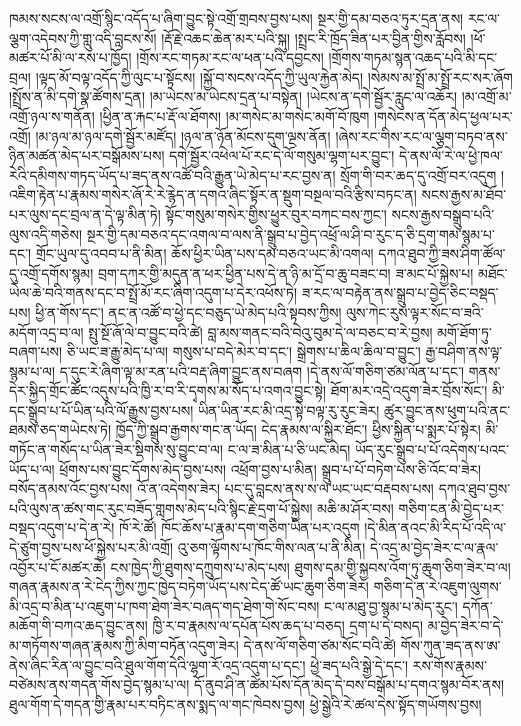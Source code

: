 \documentclass{article}
\begin{document}
ཁམས་སངས་ལ་འགྲོ་སྙིང་འདོད་པ་ཞིག་བྱུང་སྟེ་འགྲོ་གྲབས་བྱས་པས། སྔར་གྱི་དམ་བཅའ་ཏུར་དྲན་ནས། རང་ལ་ལྕག་འདེབས་ཀྱི་གླུ་འདི་བླངས་སོ། །རྡོ་རྗེ་འཆང་ཆེན་མར་པའི་སྐུ། །སྤྲང་རི་ཁྲོད་ཟིན་པར་བྱིན་གྱིས་རློབས། །ཕོ་མཚར་པོ་མི་ལ་རས་པ་ཁྱོད། །གྲོས་རང་གཏམ་རང་ལ་ཕན་པའི་དབྱངས། །གྲོགས་གཏམ་སྙན་འཆད་པའི་མི་དང་བྲལ། །ལྟད་མོ་བལྟ་འདོད་ཀྱི་ལུང་པ་སྟོངས། །སྐྱོ་བ་སངས་འདོད་ཀྱི་ཡུལ་རྐྱེན་མེད། །སེམས་མ་སྤྲོ་མ་སྤྲོ་རང་སར་ཞོག །སྤྲོས་ན་མི་དགེ་སྣ་ཚོགས་དྲན། །མ་ཡེངས་མ་ཡེངས་དྲན་པ་བསྟེན། །ཡེངས་ན་དགེ་སྦྱོར་རླུང་ལ་འཆོར། །མ་འགྲོ་མ་འགྲོ་ཉལ་ས་གནོན། །ཕྱིན་ན་རྐང་པ་རྡོ་ལ་ཐོགས། །མ་གསེང་མ་གསེང་མགོ་བོ་ཁུག །གསེངས་ན་དོན་མེད་ཕྱལ་པར་འགྲོ། །མ་ཉལ་མ་ཉལ་དགེ་སྦྱོར་མཛོད། །ཉལ་ན་ཉོན་མོངས་དུག་ལྔས་ནོན། །ཞེས་རང་གིས་རང་ལ་ལྕག་བཏབ་ནས་ཉིན་མཚན་མེད་པར་བསྒོམས་པས། དགེ་སྦྱོར་འཕེལ་པོ་རང་དེ་ལོ་གསུམ་ལྷག་པར་བྱུང་། དེ་ནས་ལོ་རེ་ལ་ཕྱེ་ཁལ་རེའི་དམིགས་གཏད་ཡོད་པ་ཟད་ནས་འཚོ་བའི་རྒྱུན་ཡེ་མེད་པ་རང་བྱས་ན། སྲོག་གི་བར་ཆད་དུ་འགྲོ་བར་འདུག །འཇིག་རྟེན་པ་རྣམས་གསེར་ཞོ་རེ་རེ་རྙེད་ན་དགའ་ཞིང་སྟོར་ན་སྡུག་བསྔལ་བའི་རྩིས་བཏང་ན། སངས་རྒྱས་མ་ཐོབ་པར་ལུས་དང་བྲལ་ན་དེ་ལྟ་མིན་ཏེ། སྟོང་གསུམ་གསེར་གྱིས་ཕྱུར་བུར་བཀང་བས་ཀྱང་། སངས་རྒྱས་བསྒྲུབ་པའི་ལུས་འདི་གཅེས། སྔར་གྱི་དམ་བཅའ་དང་འགལ་བ་ལས་ནི་སྒྲུབ་པ་བྱེད་འཕྲོ་ལ་ཤི་བ་རུང་ད་ཅི་དྲག་གམ་སྙམ་པ་དང་། གྲོང་ཡུལ་དུ་འབབ་པ་ནི་མིན། ཆོས་ཕྱིར་ཡིན་པས་དམ་བཅའ་ཡང་མི་འགལ། དཀའ་ཐུབ་ཀྱི་ཟས་ཤིག་ཚོལ་དུ་འགྲོ་དགོས་སྙམ། བྲག་དཀར་གྱི་མདུན་ན་ཕར་ཕྱིན་པས་དེ་ན་ཉི་མ་དྲོ་བ་ཆུ་བཟང་བ། ཟ་མང་པོ་སྐྱེས་པ། མཐོང་ཡེལ་ཆེ་བའི་གནས་དང་བ་སྤྲོ་མོ་རང་ཞིག་འདུག་པ་དེར་འཕོས་ཏེ། ཟ་རང་ལ་བརྟེན་ནས་སྒྲུབ་པ་བྱེད་ཅིང་བསྡད་པས། ཕྱི་ན་གོས་དང་། ནང་ན་འཚོ་བ་ཕྱེ་དང་བཅུད་ཡེ་མེད་པའི་སྟབས་ཀྱིས། ལུས་ཀེང་རུས་ལྟར་སོང་བ་ཟའི་མདོག་འདྲ་བ་ལ། སྤུ་སྔོ་ཞོ་ལེ་བ་བྱུང་བའི་ཚེ། བླ་མས་གནང་བའི་བེའུ་བུམ་དེ་ལ་བཅང་བ་རེ་བྱས། མགོ་ཐོག་ཏུ་བཞག་པས། ཅི་ཡང་ཟ་རྒྱུ་མེད་པ་ལ། གསུས་པ་བདེ་མེར་བ་དང་། སྒྲེགས་པ་ཆིལ་ཆིལ་བ་བྱུང་། རྒྱ་བཤིག་ནས་ལྟ་སྙམ་པ་ལ། ད་དུང་རེ་ཞིག་ལྟ་མ་རན་པའི་བརྡ་ཞིག་བྱུང་ནས་བཞག །དེ་ནས་ལོ་གཅིག་ཙམ་ལོན་པ་དང་། གནས་དེར་སྐྱིད་གྲོང་ཚོང་འདུས་པའི་ཁྱི་ར་བ་རི་དྭགས་མ་སོད་པ་འགའ་བྱུང་སྟེ། ཐོག་མར་འདྲེ་འདུག་ཟེར་བྲོས་སོང་། མི་དང་སྒྲུབ་པ་པོ་ཡིན་པའི་ལོ་རྒྱུས་བྱས་པས། ཡིན་ཡིན་རང་མི་འདྲ་སྟེ་བལྟ་རུ་རུང་ཟེར། ཚུར་བྱུང་ནས་ཕུག་པའི་ནང་ཐམས་ཅད་གཡེངས་ཏེ། ཁྱོད་ཀྱི་སྒྲུབ་རྒྱགས་གང་ན་ཡོད། ངེད་རྣམས་ལ་སྐྱིར་ཐོང་། ཕྱིས་སྐྱིན་པ་སྨར་པོ་སྟེར། མི་གཏོང་ན་གསོད་པ་ཡིན་ཟེར་སྡིགས་སུ་བྱུང་བ་ལ། ང་ལ་ཟ་མིན་པ་ཅི་ཡང་མེད། ཡོད་རུང་སྒྲུབ་པ་པོ་འདེགས་པའང་ཡོད་པ་ལ། ཕྲོགས་པས་བྱུང་དོགས་མེད་བྱས་པས། འཕྲོག་བྱས་པ་མིན། སྒྲུབ་པ་པོ་བཏེག་པས་ཅི་འོང་བ་ཟེར། བསོད་ནམས་འོང་བྱས་པས། འོ་ན་འདེགས་ཟེར། པང་དུ་བླངས་ནས་ས་ལ་ཡང་ཡང་བརྡབས་པས། དཀའ་ཐུབ་བྱས་པའི་ལུས་ན་ཚས་གང་རུང་བཟོད་གླགས་མེད་པའི་སྙིང་རྗེ་དྲག་པོ་སྐྱེས། མཆི་མ་ཤོར་བས། གཅིག་ངན་མི་བྱེད་པར་བསྡད་འདུག་པ་དེ་ན་རེ། ཁོ་རེ་ཚོ། ཁོང་ཆོས་པ་རྣམ་དག་གཅིག་ཡིན་པར་འདུག །དེ་མིན་ནའང་མི་རིད་པོ་འདི་ལ་དེ་ཙུག་བྱས་པས་ཕོ་སྐྱེས་པར་མི་འགྲོ། འུ་ཅག་ལྟོགས་པ་ཁོང་གིས་ལན་པ་ནི་མིན། དེ་འདྲ་མ་བྱེད་ཟེར་ང་ལ་རྣལ་འབྱོར་པ་ངོ་མཚར་ཆེ། ངས་ཁྱེད་ཀྱི་ཐུགས་དཀྲུགས་པ་མེད་པས། ཐུགས་དམ་གྱི་སྐྱབས་འོག་ཏུ་ཆུག་ཅིག་ཟེར་བ་ལ། གཞན་རྣམས་ན་རེ་ངེད་ཀྱིས་ཀྱང་ཁྱེད་བཏེག་ཡོད་པས་ངེད་ཚོ་ཡང་ཆུག་ཅིག་ཟེར། གཅིག་དེ་ན་རེ་འཇུག་ལུགས་མི་འདྲ་བ་མིན་པ་འཇུག་པ་ཁག་ཐེག་ཟེར་བཞད་གད་ཐེག་གེ་སོང་བས། ང་ལ་མཐུ་བྱ་སྙམ་པ་མེད་རུང་། དཀོན་མཆོག་གི་བཀའ་ཆད་བྱུང་ནས། ཁྱི་ར་བ་རྣམས་ལ་དཔོན་པོས་ཆད་པ་བཅད། དྲག་པ་དེ་བསད། མ་བྱེད་ཟེར་བ་དེ་མ་གཏོགས་གཞན་རྣམས་ཀྱི་མིག་བཏོན་འདུག་ཟེར། དེ་ནས་ལོ་གཅིག་ཙམ་སོང་བའི་ཚེ། གོས་ཀུན་ཟད་ནས་ཨ་ནེས་ཞིང་རིན་ལ་བྱུང་བའི་ཐུལ་གོག་དེའི་ལྷག་རོ་འདྲ་འདུག་པ་དང་། ཕྱེ་ཟད་པའི་སྒྱེ་དེ་དང་། རས་གོས་རྣམས་བཙེམས་ནས་གདན་གོས་བྱེད་སྙམ་པ་ལ། དོ་ནུབ་ཤི་ན་ཚེམ་པོས་དོན་མེད་དེ་བས་བསྒོམ་པ་དགའ་སྙམ་བོར་ནས། ཐུལ་གོག་དེ་གདན་གྱི་རྣམ་པར་བཏིང་ནས་སྨད་ལ་གང་ཁེབས་བྱས། ཕྱེ་སྒྱེའི་རེ་ཚལ་དེས་སྟོད་གཡོགས་བྱས། 
\end{document}
